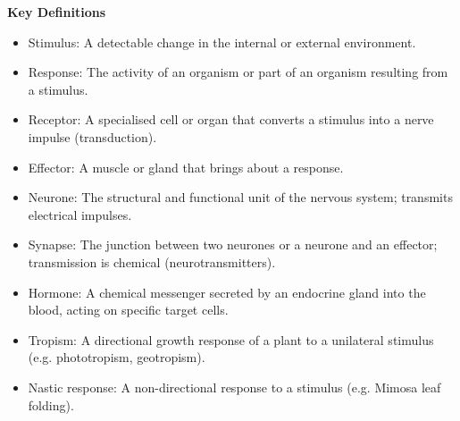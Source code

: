 \documentclass[11pt]{article}
\newcommand{\cle}[1]{{\popxbold\color{popdark}#1}}
\begin{document}
\begin{bilan}

\textbf{Key Definitions}
\begin{itemize}
  \item \cle{Stimulus}: A detectable change in the internal or external environment.
  \item \cle{Response}: The activity of an organism or part of an organism resulting from a stimulus.
  \item \cle{Receptor}: A specialised cell or organ that converts a stimulus into a nerve impulse (transduction).
  \item \cle{Effector}: A muscle or gland that brings about a response.
  \item \cle{Neurone}: The structural and functional unit of the nervous system; transmits electrical impulses.
  \item \cle{Synapse}: The junction between two neurones or a neurone and an effector; transmission is chemical (neurotransmitters).
  \item \cle{Hormone}: A chemical messenger secreted by an endocrine gland into the blood, acting on specific target cells.
  \item \cle{Tropism}: A directional growth response of a plant to a unilateral stimulus (e.g. phototropism, geotropism).
  \item \cle{Nastic response}: A non-directional response to a stimulus (e.g. Mimosa leaf folding).
\end{itemize}


\end{bilan}
\end{document}
